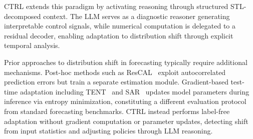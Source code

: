 \textsc{CTRL} extends this paradigm by activating reasoning through structured STL-decomposed context. The LLM serves as a diagnostic reasoner generating interpretable control signals, while numerical computation is delegated to a residual decoder, enabling adaptation to distribution shift through explicit temporal analysis.

Prior approaches to distribution shift in forecasting typically require additional mechanisms. Post-hoc methods such as ResCAL~\cite{kim2022rescal} exploit autocorrelated prediction errors but train a separate estimation module. Gradient-based test-time adaptation including TENT~\cite{wang2021tent} and SAR~\cite{niu2023sar} updates model parameters during inference via entropy minimization, constituting a different evaluation protocol from standard forecasting benchmarks. CTRL instead performs label-free adaptation without gradient computation or parameter updates, detecting shift from input statistics and adjusting policies through LLM reasoning.
